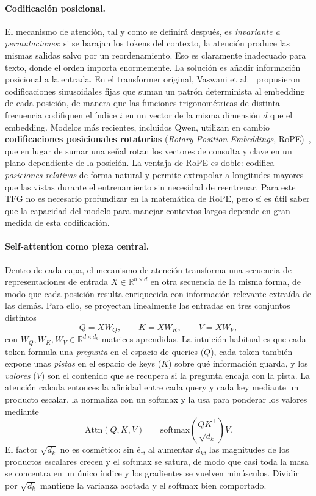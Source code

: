 \documentclass[11pt,a4paper]{article}
\begin{document}
\paragraph{Codificación posicional.} El mecanismo de atención, tal y como se definirá después, es \textit{invariante a permutaciones}: si se barajan los tokens del contexto, la atención produce las mismas salidas salvo por un reordenamiento. Eso es claramente inadecuado para texto, donde el orden importa enormemente. La solución es añadir información posicional a la entrada. En el transformer original, Vaswani et al.~\cite{vaswani2017attention} propusieron codificaciones sinusoidales fijas que suman un patrón determinista al embedding de cada posición, de manera que las funciones trigonométricas de distinta frecuencia codifiquen el índice $i$ en un vector de la misma dimensión $d$ que el embedding. Modelos más recientes, incluidos Qwen, utilizan en cambio \textbf{codificaciones posicionales rotatorias} (\textit{Rotary Position Embeddings}, RoPE)~\cite{su2021roformer}, que en lugar de sumar una señal rotan los vectores de consulta y clave en un plano dependiente de la posición. La ventaja de RoPE es doble: codifica \emph{posiciones relativas} de forma natural y permite extrapolar a longitudes mayores que las vistas durante el entrenamiento sin necesidad de reentrenar. Para este TFG no es necesario profundizar en la matemática de RoPE, pero sí es útil saber que la capacidad del modelo para manejar contextos largos depende en gran medida de esta codificación.

\paragraph{Self-attention como pieza central.} Dentro de cada capa, el mecanismo de atención transforma una secuencia de representaciones de entrada $X \in \mathbb{R}^{n\times d}$ en otra secuencia de la misma forma, de modo que cada posición resulta enriquecida con información relevante extraída de las demás. Para ello, se proyectan linealmente las entradas en tres conjuntos distintos
\[
Q = X W_Q,\qquad K = X W_K,\qquad V = X W_V,
\]
con $W_Q, W_K, W_V \in \mathbb{R}^{d\times d_k}$ matrices aprendidas. La intuición habitual es que cada token formula una \emph{pregunta} en el espacio de queries ($Q$), cada token también expone unas \emph{pistas} en el espacio de keys ($K$) sobre qué información guarda, y los \emph{valores} ($V$) son el contenido que se recupera si la pregunta encaja con la pista. La atención calcula entonces la afinidad entre cada query y cada key mediante un producto escalar, la normaliza con un softmax y la usa para ponderar los valores mediante
\[
\mathrm{Attn}(Q, K, V) \;=\; \mathrm{softmax}\!\left( \frac{Q K^\top}{\sqrt{d_k}} \right) V.
\]
El factor $\sqrt{d_k}$ no es cosmético: sin él, al aumentar $d_k$, las magnitudes de los productos escalares crecen y el softmax se satura, de modo que casi toda la masa se concentra en un único índice y los gradientes se vuelven minúsculos. Dividir por $\sqrt{d_k}$ mantiene la varianza acotada y el softmax bien comportado.
\end{document}

